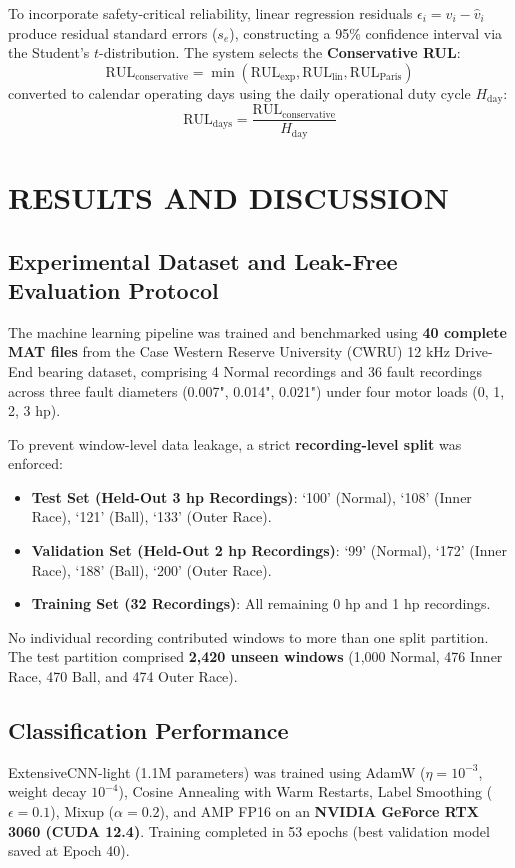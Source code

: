 \documentclass[10pt,journal,onecolumn]{IEEEtran}
\begin{document}
To incorporate safety-critical reliability, linear regression residuals $\epsilon_i = v_i - \hat{v}_i$ produce residual standard errors ($s_e$), constructing a 95\% confidence interval via the Student's $t$-distribution. The system selects the \textbf{Conservative RUL}:
\begin{equation}
\text{RUL}_{\text{conservative}} = \min\left(\text{RUL}_{\text{exp}}, \text{RUL}_{\text{lin}}, \text{RUL}_{\text{Paris}}\right)
\end{equation}
converted to calendar operating days using the daily operational duty cycle $H_{\text{day}}$:
\begin{equation}
\text{RUL}_{\text{days}} = \frac{\text{RUL}_{\text{conservative}}}{H_{\text{day}}}
\end{equation}

\section{RESULTS AND DISCUSSION}
\subsection{Experimental Dataset and Leak-Free Evaluation Protocol}
The machine learning pipeline was trained and benchmarked using \textbf{40 complete MAT files} from the Case Western Reserve University (CWRU) 12 kHz Drive-End bearing dataset, comprising 4 Normal recordings and 36 fault recordings across three fault diameters (0.007", 0.014", 0.021") under four motor loads (0, 1, 2, 3 hp).

To prevent window-level data leakage, a strict \textbf{recording-level split} was enforced:
\begin{itemize}
    \item \textbf{Test Set (Held-Out 3 hp Recordings)}: `100' (Normal), `108' (Inner Race), `121' (Ball), `133' (Outer Race).
    \item \textbf{Validation Set (Held-Out 2 hp Recordings)}: `99' (Normal), `172' (Inner Race), `188' (Ball), `200' (Outer Race).
    \item \textbf{Training Set (32 Recordings)}: All remaining 0 hp and 1 hp recordings.
\end{itemize}
No individual recording contributed windows to more than one split partition. The test partition comprised \textbf{2,420 unseen windows} (1,000 Normal, 476 Inner Race, 470 Ball, and 474 Outer Race).

\subsection{Classification Performance}
ExtensiveCNN-light (1.1M parameters) was trained using AdamW ($\eta = 10^{-3}$, weight decay $10^{-4}$), Cosine Annealing with Warm Restarts, Label Smoothing ($\epsilon = 0.1$), Mixup ($\alpha = 0.2$), and AMP FP16 on an \textbf{NVIDIA GeForce RTX 3060 (CUDA 12.4)}. Training completed in 53 epochs (best validation model saved at Epoch 40).
\end{document}

